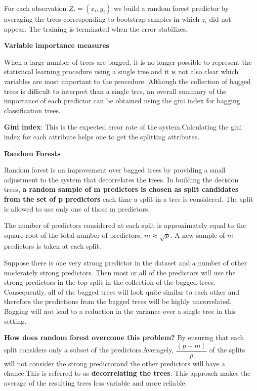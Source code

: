 For each observation $Z_{i}=(x_{i},y_{i})$ we build a random forest predictor by averaging the trees corresponding to bootstrap samples in which $z_{i}$ did not appear. The training is terminated when the error stabilizes.

\begin{center}
\textbf{Variable importance measures}
\end{center}

When a large number of trees are bagged, it is no longer possible to represent the statistical learning procedure using a single tree,and it is not also clear which variables are most important to the procedure. Although the collection of bagged trees is difficult to interpret than a single tree, an overall summary of the importance of each predictor can be obtained using the gini index for bagging classification trees.

\textbf{Gini index}: This is the expected error rate of the system.Calculating the gini index for each attribute helps one to get the splitting attributes.


\begin{center}
\textbf{Random Forests}
\end{center}

Random forest is an improvement over bagged trees by providing a small adjustment to the system that decorrelates the trees. In building the decision trees, \textbf{a random sample of m predictors is chosen as split candidates from the set of p predictors} each time a split in a tree is considered. The split is allowed to use only one of those m predictors.

The number of predictors considered at each split is approximately equal to the square root of the total number of predictors, $m\approx \sqrt{p}$. A new sample of $m$ predictors is taken at each split.

Suppose there is one very strong predictor in the dataset and a number of other moderately strong predictors. Then most or all of the predictors will use the strong predictors in the top split in the collection of the bagged trees. Consequently,
all of the bagged trees will look quite similar to each other and therefore the predictions from the bagged trees will be highly uncorrelated. Bagging will not lead to a reduction in the variance over a single tree in this setting.

\textbf{How does random forest overcome this problem?} By ensuring that each split considers only a subset of the predictors.Averagely, $\dfrac{(p-m)}{p}$ of the splits will not consider the strong predictorand the other predictors will have a chance.This is referred to as \textbf{decorrelating the trees}. This approach makes the average of the resulting trees less variable and more reliable.

